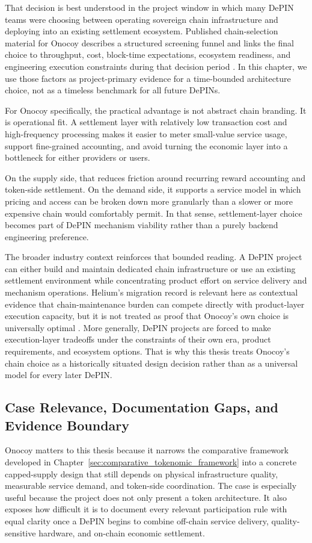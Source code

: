 That decision is best understood in the project window in which many DePIN teams were choosing between operating sovereign chain infrastructure and deploying into an existing settlement ecosystem. Published chain-selection material for Onocoy describes a structured screening funnel and links the final choice to throughput, cost, block-time expectations, ecosystem readiness, and engineering execution constraints during that decision period \cite{Ballandies2023ChainSelection}. In this chapter, we use those factors as project-primary evidence for a time-bounded architecture choice, not as a timeless benchmark for all future DePINs.

For Onocoy specifically, the practical advantage is not abstract chain branding. It is operational fit. A settlement layer with relatively low transaction cost and high-frequency processing makes it easier to meter small-value service usage, support fine-grained accounting, and avoid turning the economic layer into a bottleneck for either providers or users.

On the supply side, that reduces friction around recurring reward accounting and token-side settlement. On the demand side, it supports a service model in which pricing and access can be broken down more granularly than a slower or more expensive chain would comfortably permit. In that sense, settlement-layer choice becomes part of DePIN mechanism viability rather than a purely backend engineering preference.

The broader industry context reinforces that bounded reading. A DePIN project can either build and maintain dedicated chain infrastructure or use an existing settlement environment while concentrating product effort on service delivery and mechanism operations. Helium's migration record is relevant here as contextual evidence that chain-maintenance burden can compete directly with product-layer execution capacity, but it is not treated as proof that Onocoy's own choice is universally optimal \cite{HeliumHIP70}. More generally, DePIN projects are forced to make execution-layer tradeoffs under the constraints of their own era, product requirements, and ecosystem options. That is why this thesis treats Onocoy's chain choice as a historically situated design decision rather than as a universal model for every later DePIN.

\subsection{Case Relevance, Documentation Gaps, and Evidence Boundary}
Onocoy matters to this thesis because it narrows the comparative framework developed in Chapter~\ref{sec:comparative_tokenomic_framework} into a concrete capped-supply design that still depends on physical infrastructure quality, measurable service demand, and token-side coordination. The case is especially useful because the project does not only present a token architecture. It also exposes how difficult it is to document every relevant participation rule with equal clarity once a DePIN begins to combine off-chain service delivery, quality-sensitive hardware, and on-chain economic settlement.


